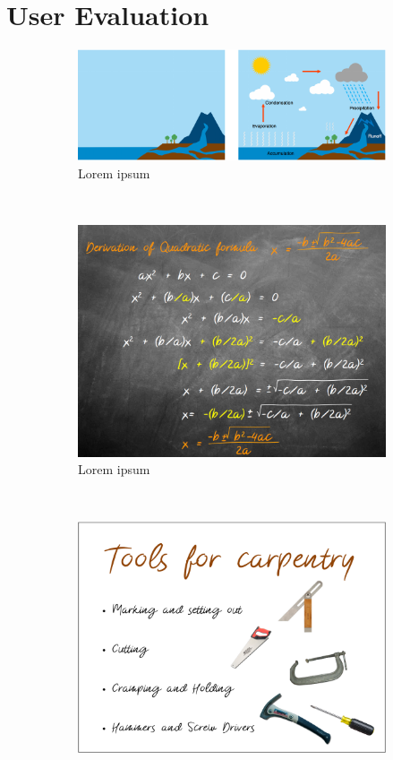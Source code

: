\section{User Evaluation}
\begin{figure}[t!]
    \centering
    \begin{subfigure}[t]{1\columnwidth}
        \centering
        \includegraphics[width=1\columnwidth]{figures/watercycle}
        \caption{Lorem ipsum}
    \end{subfigure}
    ~ 
    \begin{subfigure}[t]{0.48\columnwidth}
        \centering
        \includegraphics[width=1\columnwidth]{figures/quadformula}
        \caption{Lorem ipsum}
    \end{subfigure}  
    ~
    \begin{subfigure}[t]{0.48\columnwidth}
        \centering
        \includegraphics[width=1\columnwidth]{figures/tools}

\end{subfigure}
\end{figure}
